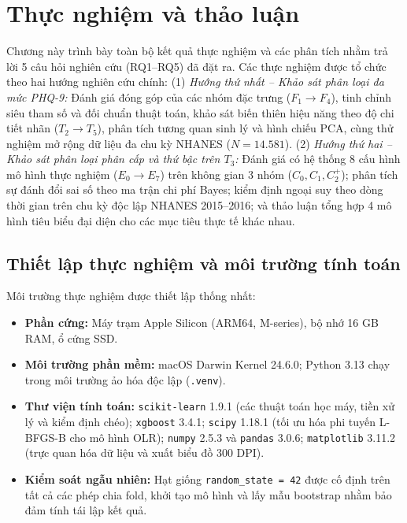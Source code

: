 \chapter{Thực nghiệm và thảo luận}
\label{ch:thuc-nghiem}

Chương này trình bày toàn bộ kết quả thực nghiệm và các phân tích nhằm trả lời 5 câu hỏi nghiên cứu (RQ1--RQ5) đã đặt ra. Các thực nghiệm được tổ chức theo hai hướng nghiên cứu chính:
(1) \textit{Hướng thứ nhất -- Khảo sát phân loại đa mức PHQ-9:} Đánh giá đóng góp của các nhóm đặc trưng ($F_1 \to F_4$), tinh chỉnh siêu tham số và đối chuẩn thuật toán, khảo sát biến thiên hiệu năng theo độ chi tiết nhãn ($T_2 \to T_5$), phân tích tương quan sinh lý và hình chiếu PCA, cùng thử nghiệm mở rộng dữ liệu đa chu kỳ NHANES ($N = 14.581$).
(2) \textit{Hướng thứ hai -- Khảo sát phân loại phân cấp và thứ bậc trên $T_3$:} Đánh giá có hệ thống 8 cấu hình mô hình thực nghiệm ($E_0 \to E_7$) trên không gian 3 nhóm ($C_0, C_1, C_2^+$); phân tích sự đánh đổi sai số theo ma trận chi phí Bayes; kiểm định ngoại suy theo dòng thời gian trên chu kỳ độc lập NHANES 2015--2016; và thảo luận tổng hợp 4 mô hình tiêu biểu đại diện cho các mục tiêu thực tế khác nhau.

\section{Thiết lập thực nghiệm và môi trường tính toán}
\label{sec:moi-truong-thuc-nghiem}

Môi trường thực nghiệm được thiết lập thống nhất:
\begin{itemize}
    \item \textbf{Phần cứng:} Máy trạm Apple Silicon (ARM64, M-series), bộ nhớ 16 GB RAM, ổ cứng SSD.
    \item \textbf{Môi trường phần mềm:} macOS Darwin Kernel 24.6.0; Python 3.13 chạy trong môi trường ảo hóa độc lập (\texttt{.venv}).
    \item \textbf{Thư viện tính toán:} \texttt{scikit-learn} 1.9.1 (các thuật toán học máy, tiền xử lý và kiểm định chéo); \texttt{xgboost} 3.4.1; \texttt{scipy} 1.18.1 (tối ưu hóa phi tuyến L-BFGS-B cho mô hình OLR); \texttt{numpy} 2.5.3 và \texttt{pandas} 3.0.6; \texttt{matplotlib} 3.11.2 (trực quan hóa dữ liệu và xuất biểu đồ 300 DPI).
    \item \textbf{Kiểm soát ngẫu nhiên:} Hạt giống \texttt{random\_state = 42} được cố định trên tất cả các phép chia fold, khởi tạo mô hình và lấy mẫu bootstrap nhằm bảo đảm tính tái lập kết quả.
\end{itemize}

